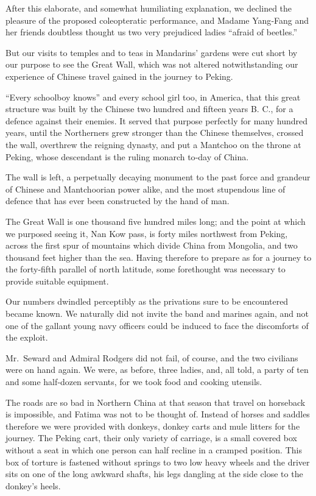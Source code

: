 \documentclass[12pt]{book}
\begin{document}
After this elaborate, and somewhat humiliating explanation, we declined the
pleasure of the proposed coleopteratic performance, and Madame Yang‐Fang and
her friends doubtless thought us two very prejudiced ladies “afraid of beetles.”

But our visits to temples and to teas in Mandarins’ gardens were cut short by
our purpose to see the Great Wall, which was not altered notwithstanding our
experience of Chinese travel gained in the journey to Peking.

“Every schoolboy knows” and every school girl too, in America, that this
great structure was built by the Chinese two hundred and fifteen years B. C., for a
defence against their enemies. It served that purpose perfectly for many hundred
years, until the Northerners grew stronger than the Chinese themselves, crossed
the wall, overthrew the reigning dynasty, and put a Mantchoo on the throne at
Peking, whose descendant is the ruling monarch to‐day of China.

The wall is left, a perpetually decaying monument to the past force and
grandeur of Chinese and Mantchoorian power alike, and the most stupendous
line of defence that has ever been constructed by the hand of man.

The Great Wall is one thousand five hundred miles long; and the point at
which we purposed seeing it, Nan Kow pass, is forty miles northwest from Peking,
across the first spur of mountains which divide China from Mongolia, and two
thousand feet higher than the sea. Having therefore to prepare as for a journey
to the forty‐fifth parallel of north latitude, some forethought was necessary to
provide suitable equipment.

Our numbers dwindled perceptibly as the privations sure to be encountered
became known. We naturally did not invite the band and marines again, and not
one of the gallant young navy officers could be induced to face the discomforts of
the exploit.

Mr.~Seward and Admiral Rodgers did not fail, of course, and the two civilians
were on hand again. We were, as before, three ladies, and, all told, a party of ten
and some half‐dozen servants, for we took food and cooking utensils.

The roads are so bad in Northern China at that season that travel on horseback
is impossible, and Fatima was not to be thought of. Instead of horses and saddles
therefore we were provided with donkeys, donkey carts and mule litters for the
journey. The Peking cart, their only variety of carriage, is a small covered box
without a seat in which one person can half recline in a cramped position. This
box of torture is fastened without springs to two low heavy wheels and the driver
sits on one of the long awkward shafts, his legs dangling at the side close to the
donkey’s heels.
\end{document}
